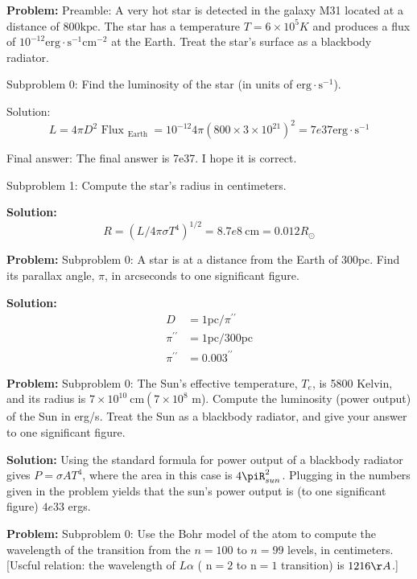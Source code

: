 \documentclass[10pt]{article}
\begin{document}
\textbf{Problem:}
Preamble: A very hot star is detected in the galaxy M31 located at a distance of $800 \mathrm{kpc}$. The star has a temperature $T = 6 \times 10^{5} K$ and produces a flux of $10^{-12} \mathrm{erg} \cdot \mathrm{s}^{-1} \mathrm{cm}^{-2}$ at the Earth. Treat the star's surface as a blackbody radiator.

Subproblem 0: Find the luminosity of the star (in units of $\mathrm{erg} \cdot \mathrm{s}^{-1}$).


Solution: \[
  L=4 \pi D^{2} \text { Flux }_{\text {Earth }}=10^{-12} 4 \pi\left(800 \times 3 \times 10^{21}\right)^{2}=\boxed{7e37} \mathrm{erg} \cdot \mathrm{s}^{-1}
\]

Final answer: The final answer is 7e37. I hope it is correct.

Subproblem 1: Compute the star's radius in centimeters.


\textbf{Solution:}
\[
  R=\left(L / 4 \pi \sigma T^{4}\right)^{1 / 2}=\boxed{8.7e8} \mathrm{~cm}=0.012 R_{\odot}
\]


\textbf{Problem:}
Subproblem 0: A star is at a distance from the Earth of $300 \mathrm{pc}$. Find its parallax angle, $\pi$, in arcseconds to one significant figure.


\textbf{Solution:}
\[
\begin{aligned}
D &=1 \mathrm{pc} / \pi^{\prime \prime} \\
\pi^{\prime \prime} &=1 \mathrm{pc} / 300 \mathrm{pc} \\
\pi^{\prime \prime} &=\boxed{0.003}^{\prime \prime}
\end{aligned}
\]


\textbf{Problem:}
Subproblem 0: The Sun's effective temperature, $T_{e}$, is 5800 Kelvin, and its radius is $7 \times 10^{10} \mathrm{~cm}\left(7 \times 10^{8}\right.$ m). Compute the luminosity (power output) of the Sun in erg/s. Treat the Sun as a blackbody radiator, and give your answer to one significant figure.


\textbf{Solution:}
Using the standard formula for power output of a blackbody radiator gives $P = \sigma A T^4$, where the area in this case is $4\piR_{sun}^2$.  Plugging in the numbers given in the problem yields that the sun's power output is (to one significant figure) $\boxed{4e33}$ ergs.


\textbf{Problem:}
Subproblem 0: Use the Bohr model of the atom to compute the wavelength of the transition from the $n=100$ to $n=99$ levels, in centimeters. [Uscful relation: the wavelength of $L \alpha$ ( $\mathrm{n}=2$ to $\mathrm{n}=1$ transition) is $1216 \AA$.]
\end{document}
